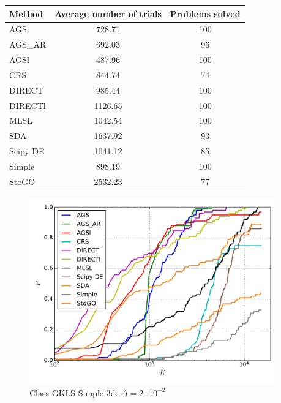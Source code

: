 \documentclass[a4paper]{article}
\begin{document}
\begin{tabular}{lcc}
\hline
 Method   &  Average number of trials  &  Problems solved  \\
\hline
 AGS      &           728.71           &        100        \\
 AGS\_AR   &           692.03           &        96         \\
 AGSl     &           487.96           &        100        \\
 CRS      &           844.74           &        74         \\
 DIRECT   &           985.44           &        100        \\
 DIRECTl  &          1126.65           &        100        \\
 MLSL     &          1042.54           &        100        \\
 SDA      &          1637.92           &        93         \\
 Scipy DE &          1041.12           &        85         \\
 Simple   &           898.19           &        100        \\
 StoGO    &          2532.23           &        77         \\
\hline
\end{tabular}
\begin{figure}[H]
  \center
  \includegraphics[width=0.95\textwidth]{../experiments/gklss3d/cmc.pdf}
  \caption{Class GKLS Simple 3d. $\Delta=2\cdot10^{-2}$}
\end{figure}
\end{document}
